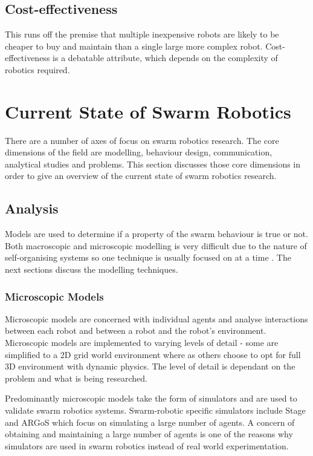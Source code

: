 \subsection{Cost-effectiveness}
This runs off the premise that multiple inexpensive robots are likely to be cheaper to buy and maintain than a single large more complex robot. Cost-effectiveness is a debatable attribute, which depends on the complexity of robotics required. 

\section{Current State of Swarm Robotics}

There are a number of axes of focus on swarm robotics research. The core dimensions of the field are modelling, behaviour design, communication, analytical studies and problems. This section discusses those core dimensions in order to give an overview of the current state of swarm robotics research. 

\subsection{Analysis}
Models are used to determine if a property of the swarm behaviour is true or not. Both macroscopic and microscopic modelling is very difficult due to the nature of self-organising systems so one technique is usually focused on at a time \cite{abbott2006emergence}. The next sections discuss the modelling techniques.

\subsubsection{Microscopic Models}
\label{microscopicmodels}

Microscopic models are concerned with individual agents and analyse interactions between each robot and between a robot and the robot's environment. Microscopic models are implemented to varying levels of detail - some are simplified to a 2D grid world environment where as others choose to opt for full 3D environment with dynamic physics. The level of detail is dependant on the problem and what is being researched.

Predominantly microscopic models take the form of simulators and are used to validate swarm robotics systems. Swarm-robotic specific simulators include Stage \cite{vaughan2008massively} and ARGoS \cite{pinciroli2011argos} which focus on simulating a large number of agents. A concern of obtaining and maintaining a large number of agents is one of the reasons why simulators are used in swarm robotics instead of real world experimentation.

